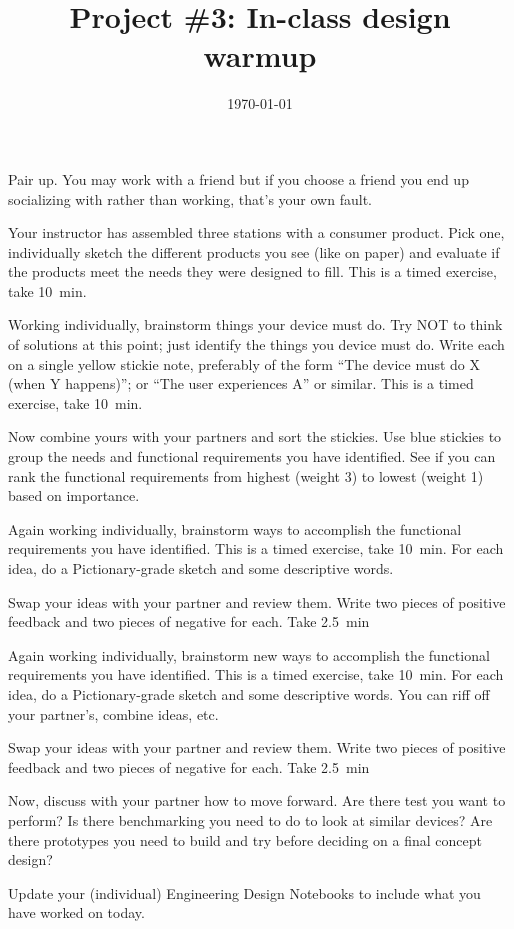 \documentclass [hw]{exam}
\title{Project \#3: In-class design warmup}
\author{\mobeardInstructorShort}
\date{\today}
\begin{document}
\maketitle

\begin{questions}
\question Pair up. You may work with a friend but if you choose a friend you end up socializing with rather than working, that's your own fault. 

\question Your instructor has assembled three stations with a consumer product. Pick one, individually sketch the different products you see (like on paper) and evaluate if the products meet the needs they were designed to fill. This is a timed exercise, take \SI{10}{\minute}.

\question Working individually, brainstorm things your device must do. Try NOT to think of solutions at this point; just identify the things you device must do. Write each on a single yellow stickie note, preferably of the form ``The device must do X (when Y happens)''; or ``The user experiences A'' or similar. This is a timed exercise, take \SI{10}{\minute}.

\question Now combine yours with your partners and sort the stickies. Use blue stickies to group the needs and functional requirements you have identified. See if you can rank the functional requirements from highest (weight 3) to lowest (weight 1) based on importance. 

\question Again working individually, brainstorm ways to accomplish the functional requirements you have identified. This is a timed exercise, take \SI{10}{\minute}. For each idea, do a Pictionary-grade sketch and some descriptive words. 

\question Swap your ideas with your partner and review them. Write two pieces of positive feedback and two pieces of negative for each. Take \SI{2.5}{\minute}

\question Again working individually, brainstorm new ways to accomplish the functional requirements you have identified. This is a timed exercise, take \SI{10}{\minute}. For each idea, do a Pictionary-grade sketch and some descriptive words. You can riff off your partner's, combine ideas, etc. 

\question Swap your ideas with your partner and review them. Write two pieces of positive feedback and two pieces of negative for each. Take \SI{2.5}{\minute}

\question Now, discuss with your partner how to move forward. Are there test you want to perform? Is there benchmarking you need to do to look at similar devices? Are there prototypes you need to build and try before deciding on a final concept design? 

\question Update your (individual) Engineering Design Notebooks to include what you have worked on today.
\end{questions}
\end{document}
